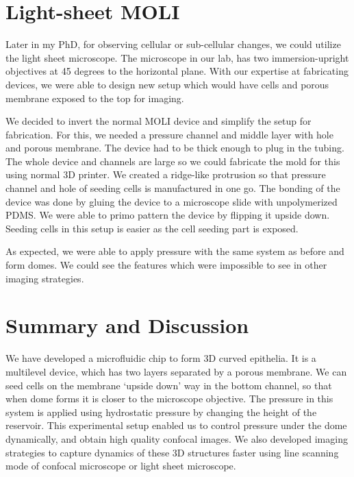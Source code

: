 \hypertarget{light-sheet-moli}{%
\section{Light-sheet MOLI}\label{light-sheet-moli}}

Later in my PhD, for observing cellular or sub-cellular changes, we
could utilize the light sheet microscope. The microscope in our lab, has
two immersion-upright objectives at 45 degrees to the horizontal plane.
With our expertise at fabricating devices, we were able to design new
setup which would have cells and porous membrane exposed to the top for
imaging.

We decided to invert the normal MOLI device and simplify the setup for
fabrication. For this, we needed a pressure channel and middle layer
with hole and porous membrane. The device had to be thick enough to plug
in the tubing. The whole device and channels are large so we could
fabricate the mold for this using normal 3D printer. We created a
ridge-like protrusion so that pressure channel and hole of seeding cells
is manufactured in one go. The bonding of the device was done by gluing
the device to a microscope slide with unpolymerized PDMS. We were able
to primo pattern the device by flipping it upside down. Seeding cells in
this setup is easier as the cell seeding part is exposed.

As expected, we were able to apply pressure with the same system as
before and form domes. We could see the features which were impossible
to see in other imaging strategies.

\newpage
\hypertarget{summary-and-discussion}{%
\section{Summary and Discussion}\label{summary-and-discussion}}

We have developed a microfluidic chip to form 3D curved epithelia. It is
a multilevel device, which has two layers separated by a porous
membrane. We can seed cells on the membrane `upside down' way in the
bottom channel, so that when dome forms it is closer to the microscope
objective. The pressure in this system is applied using hydrostatic
pressure by changing the height of the reservoir. This experimental
setup enabled us to control pressure under the dome dynamically, and
obtain high quality confocal images. We also developed imaging
strategies to capture dynamics of these 3D structures faster using line
scanning mode of confocal microscope or light sheet microscope.

